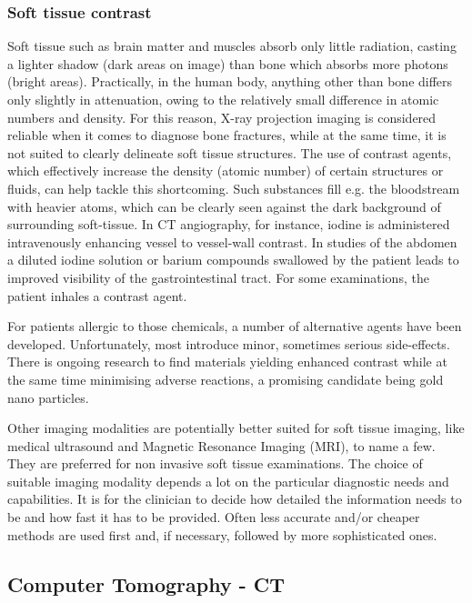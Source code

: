 \subsubsection{Soft tissue contrast}
\label{sec:soft}
Soft tissue such as brain matter and muscles absorb only little radiation, casting a lighter shadow (dark areas on image) than bone which absorbs more photons (bright areas).
Practically, in the human body, anything other than bone differs only slightly in attenuation, owing to the relatively small difference in atomic numbers and density.
For this reason, X-ray projection imaging is considered reliable when it comes to diagnose bone fractures, while at the same time, it is not suited to clearly delineate soft tissue structures.
The use of contrast agents, which effectively increase the density (atomic number) of certain structures or fluids, can help tackle this shortcoming.
Such substances fill e.g. the bloodstream with heavier atoms, which can be clearly seen against the dark background of surrounding soft-tissue.
In CT angiography, for instance, iodine is administered intravenously enhancing vessel to vessel-wall contrast.
In studies of the abdomen a diluted iodine solution or barium compounds swallowed by the patient leads to improved visibility of the gastrointestinal tract.
For some examinations, the patient inhales a contrast agent.

For patients allergic to those chemicals, a number of alternative agents have been developed.
Unfortunately, most introduce minor, sometimes serious side-effects.
There is ongoing research to find materials yielding enhanced contrast while at the same time minimising adverse reactions, a promising candidate being gold nano particles. \parencite{Podgorsak, Maidment2014}


Other imaging modalities are potentially better suited for soft tissue imaging, like medical ultrasound and Magnetic Resonance Imaging (MRI), to name a few.
They are preferred for non invasive soft tissue examinations.
The choice of suitable imaging modality depends a lot on the particular diagnostic needs and capabilities.
It is for the clinician to decide how detailed the information needs to be and how fast it has to be provided.
Often less accurate and/or cheaper methods are used first and, if necessary, followed by more sophisticated ones.


\subsection{Computer Tomography - CT}

